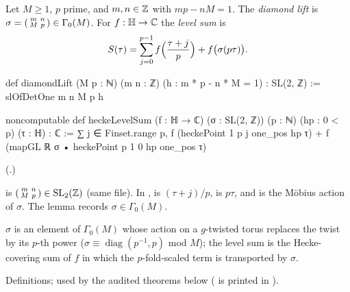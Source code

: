 \begin{definition}\label{ch16:def:diamond}
Let $M\ge1$, $p$ prime, and $m,n\in{\mathbb{Z}}$ with $mp-nM=1$.  The \emph{diamond lift} is
$\sigma=\left(\begin{smallmatrix}m&n\\M&p\end{smallmatrix}\right)\in\Gamma_0(M)$.  For $f:\mathbb{H}\to{\mathbb{C}}$ the \emph{level sum} is
\begin{equation*}
  S(\tau)=\sum_{j=0}^{p-1}f\Bigl(\frac{\tau+j}{p}\Bigr)+f\bigl(\sigma(p\tau)\bigr).
\end{equation*}
\end{definition}
\begin{leancode}
def diamondLift (M p : ℕ) (m n : ℤ) (h : m * p - n * M = 1) : SL(2, ℤ) :=
  slOfDetOne m n M p h

noncomputable def heckeLevelSum (f : ℍ → ℂ) (σ : SL(2, ℤ)) (p : ℕ) (hp : 0 < p) (τ : ℍ) : ℂ :=
  ∑ j ∈ Finset.range p, f (heckePoint 1 p j one_pos hp τ) +
    f (mapGL ℝ σ • heckePoint p 1 0 hp one_pos τ)
\end{leancode}
(.)
\begin{dictionary}
 is $\left(\begin{smallmatrix}m&n\\M&p\end{smallmatrix}\right)\in\mathrm{SL}_2(\mathbb{Z})$ (same file).  In ,
 is $(\tau+j)/p$,  is $p\tau$, and  is the M\"obius
action of $\sigma$.  The lemma  records $\sigma\in\Gamma_0(M)$.
\end{dictionary}
\begin{physics}
$\sigma$ is an element of $\Gamma_0(M)$ whose action on a $g$-twisted torus replaces the twist by its $p$-th power
($\sigma\equiv\operatorname{diag}(p^{-1},p)$ mod $M$); the level sum is the Hecke-covering sum of $f$ in which the
$p$-fold-scaled term is transported by $\sigma$.
\end{physics}
\begin{status}
Definitions; used by the audited theorems below ( is printed in
).
\end{status}

